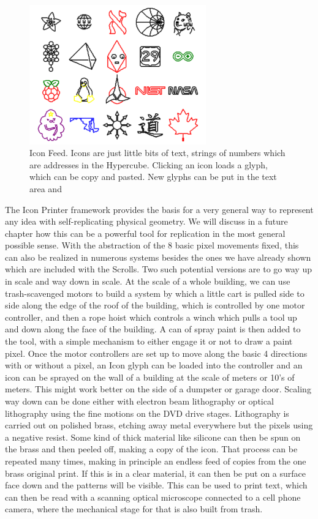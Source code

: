 \begin{figure}
	\centering
	\includegraphics[width=3in]{figures/machines/iconfeed.png}
	\caption[iconfeed]
	{Icon Feed.  Icons are just little bits of text, strings of numbers which are addresses in the Hypercube.  Clicking an icon loads a glyph, which can be copy and pasted. New glyphs can be put in the text area and }
\end{figure}

The Icon Printer framework provides the basis for a very general way to represent any idea with self-replicating physical geometry.  We will discuss in a future chapter how this can be a powerful tool for replication in the most general possible sense.  With the abstraction of the 8 basic pixel movements fixed, this can also be realized in numerous systems besides the ones we have already shown which are included with the Scrolls.  Two such potential versions are to go way up in scale and way down in scale.  At the scale of a whole building, we can use trash-scavenged motors to build a system by which a little cart is pulled side to side along the edge of the roof of the building, which is controlled by one motor controller, and then a rope hoist which controls a winch which pulls a tool up and down along the face of the building.  A can of spray paint is then added to the tool, with a simple mechanism to either engage it or not to draw a paint pixel.  Once the motor controllers are set up to move along the basic 4 directions with or without a pixel, an Icon glyph can be loaded into the controller and an icon can be sprayed on the wall of a building at the scale of meters or 10's of meters.  This might work better on the side of a dumpster or garage door.  Scaling way down can be done either with electron beam lithography or optical lithography using the fine motions on the DVD drive stages.  Lithography is carried out on polished brass, etching away metal everywhere but the pixels using a negative resist.  Some kind of thick material like silicone can then be spun on the brass and then peeled off, making a copy of the icon.  That process can be repeated many times, making in principle an endless feed of copies from the one brass original print.  If this is in a clear material, it can then be put on a surface face down and the patterns will be visible.  This can be used to print text, which can then be read with a scanning optical microscope connected to a cell phone camera, where the mechanical stage for that is also built from trash.  


